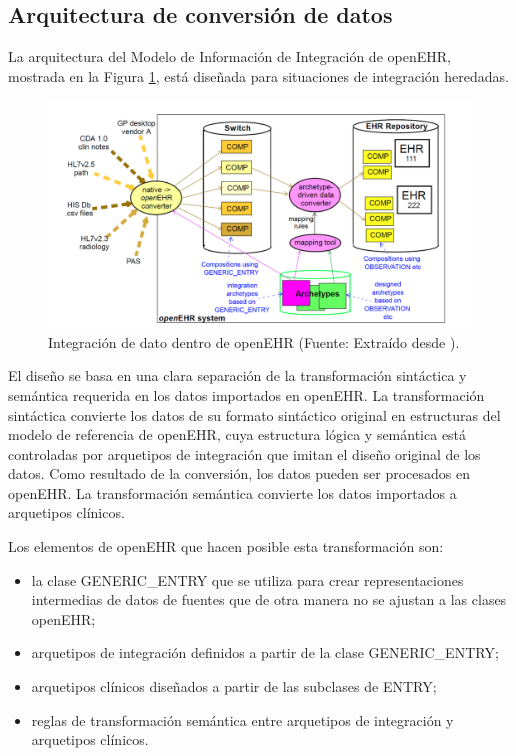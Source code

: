 \subsection{Arquitectura de conversión de datos}

La arquitectura del Modelo de Información de Integración de openEHR, mostrada en la Figura \ref{fig:data_conversion_architecture}, está diseñada para situaciones de integración heredadas.

\begin{figure}[h]
  \centering
  \includegraphics[scale=0.4]{./images/data_conversion_architecture}
  \caption{Integración de dato dentro de openEHR (Fuente: Extraído desde \cite{openEHR}).}
  \label{fig:data_conversion_architecture}
\end{figure}

El diseño se basa en una clara separación de la transformación sintáctica y semántica requerida en los datos importados en openEHR. La transformación sintáctica convierte los datos de su formato sintáctico original en estructuras del modelo de referencia de openEHR, cuya estructura lógica y semántica está controladas por arquetipos de integración que imitan el diseño original de los datos. Como resultado de la conversión, los datos pueden ser procesados en openEHR. La transformación semántica convierte los datos importados a arquetipos clínicos.

Los elementos de openEHR que hacen posible esta transformación son:
\begin{itemize}
  \item la clase GENERIC\_ENTRY que se utiliza para crear representaciones intermedias de datos de fuentes que de otra manera no se ajustan a las clases openEHR;
  \item arquetipos de integración definidos a partir de la clase GENERIC\_ENTRY;
  \item arquetipos clínicos diseñados a partir de las subclases de ENTRY;
  \item reglas de transformación semántica entre arquetipos de integración y arquetipos clínicos.
\end{itemize}
